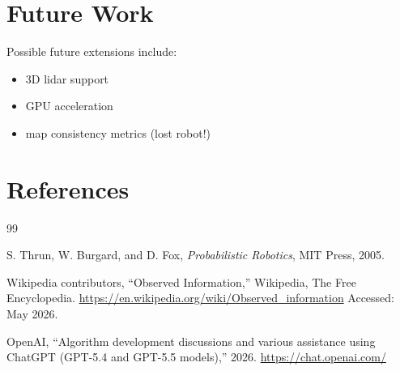 \documentclass[11pt]{article}
\begin{document}
\section{Future Work}

Possible future extensions include:
\begin{itemize}
    \item 3D lidar support
    \item GPU acceleration
    \item map consistency metrics (lost robot!)
\end{itemize}

\section{References}

\begin{thebibliography}{99}

S. Thrun, W. Burgard, and D. Fox,
\emph{Probabilistic Robotics},
MIT Press, 2005.

Wikipedia contributors,
``Observed Information,''
Wikipedia, The Free Encyclopedia.
\url{https://en.wikipedia.org/wiki/Observed_information}
Accessed: May 2026.

OpenAI,
``Algorithm development discussions and various assistance using ChatGPT
(GPT-5.4 and GPT-5.5 models),''
2026.
\url{https://chat.openai.com/}

\end{thebibliography}
\end{document}
